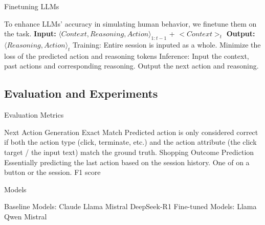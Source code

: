 \documentclass[scheme=plain,aspectratio=169]{beamer}
\begin{document}
\begin{frame}{Finetuning LLMs}
  \begin{outline}
    \1 To enhance LLMs' accuracy in simulating human behavior, we finetune them on the task.
    \2 \textbf{Input:} ${\langle Context, Reasoning, Action\rangle}_{1:t-1}$ + $<Context>_t$ 
    \2 \textbf{Output:} $\langle Reasoning, Action\rangle _{t}$
    \1 Training:
      \2 Entire session is inputed as a whole.
      \2 Minimize the loss of the predicted action and reasoning tokens
    \1 Inference:
      \2 Input the context, past actions and corresponding reasoning.
      \2 Output the next action and reasoning.
  \end{outline}
\end{frame}

\subsection{Evaluation and Experiments}

\begin{frame}{Evaluation Metrics}
  \begin{outline}
    \1 Next Action Generation
      \2 Exact Match
      \2 Predicted action is only considered correct if both the action type (click, terminate, etc.) and the action attribute (the click target / the input text) match the ground truth.
      \pause
    \1 Shopping Outcome Prediction
      \2 Essentially predicting the last action based on the session history.
      \2 One of  on a  button or  the session.
      \2 F1 score
  \end{outline}
\end{frame}

\begin{frame}{Models}
  \begin{outline}
    \1 Baseline Models:
      \2 Claude
      \2 Llama
      \2 Mistral
      \2 DeepSeek-R1
    \1 Fine-tuned Models:
      \2 Llama
      \2 Qwen
      \2 Mistral
  \end{outline}
\end{frame}
\end{document}

